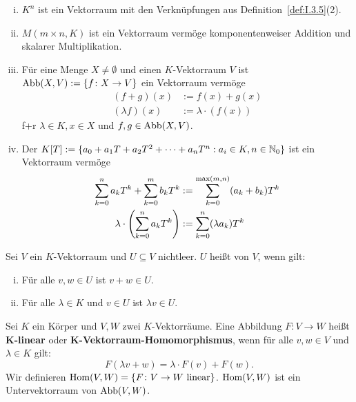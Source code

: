 \begin{beispiel}
	\label{bsp:I.5.2}
	\begin{enumerate}[(i)]
		\item $K^n$ ist ein Vektorraum mit den Verknüpfungen aus Definition~\ref{def:I.3.5}(2).
		\item $M(m \times n,K)$ ist ein Vektorraum vermöge komponentenweiser Addition und skalarer Multiplikation.
		\item Für eine Menge $X \neq \emptyset$ und einen $K$-Vektorraum $V$ ist $\operatorname{Abb}(X,V) := \{f \colon X \rightarrow V\}$ ein Vektorraum vermöge
		\begin{align*}
			(f+g)(x) &:= f(x) + g(x) \\
			(\lambda f)(x) &:= \lambda \cdot (f(x))
		\end{align*}
		f+r $\lambda \in K, x \in X$ und $f,g \in \operatorname{Abb}(X,V)$.
		\item Der  $K[T] := \{a_0 + a_1 T + a_2 T^2 + \dots + a_n T^n : a_i \in K, n \in \mathbb{N}_0\}$ ist ein Vektorraum vermöge
		\begin{align*}
			\sum_{k=0}^{n} a_kT^k + \sum_{k=0}^{m} b_kT^k &:= \sum_{k=0}^{\max(m,n)} (a_k + b_k)T^k \\
			\lambda \cdot \left(\sum_{k=0}^{n} a_kT^k\right) &:= \sum_{k=0}^{n} (\lambda a_k)T^k
		\end{align*}
	\end{enumerate}	
\end{beispiel}
\newpage
\setcounter{satz}{3}
\begin{definition}[Untervektorraum]
	\label{def:I.5.4}
	Sei $V$ ein $K$-Vektorraum und $U \subseteq V$ nichtleer.
	$U$ heißt  von $V$, wenn gilt:
	\begin{enumerate}[(i)]
		\item Für alle $v,w \in U$ ist $v+w \in U$.
		\item Für alle $\lambda \in K$ und $v \in U$ ist $\lambda v \in U$.
	\end{enumerate}
\end{definition}

\setcounter{satz}{6}
\begin{definition}
	\label{def:I.5.7}
	Sei $K$ ein Körper und $V,W$ zwei $K$-Vektorräume.
	Eine Abbildung $F \colon V \rightarrow W$ heißt $\mathbf{K}$\textbf{-linear} oder $\mathbf{K}$\textbf{-Vektorraum-Homomorphismus}, wenn für alle $v,w \in V$ und $\lambda \in K$ gilt:
	\[
		F(\lambda v + w) = \lambda \cdot F(v) + F(w).
	\]
	Wir definieren $\operatorname{Hom}(V,W) = \{F \colon V \rightarrow W \text{ linear}\}$.
	$\operatorname{Hom}(V,W)$ ist ein Untervektorraum von $\operatorname{Abb}(V,W)$.
\end{definition}

